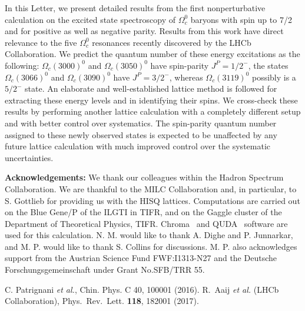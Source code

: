 \documentclass[showkeys,aps,twocolumn,showpacs,preprintnumbers,amsmath,amssymb,prd,letterpaper,floatfix,nofootinbib,superscriptaddress,]{revtex4-1}
\begin{document}
{
In this Letter, we present detailed results from the first
nonperturbative calculation on the excited state spectroscopy of
$\Omega^{0}_{c}$ baryons with spin up to 7/2 and for positive as well
as negative parity.  Results from this work have direct relevance to
the five $\Omega^{0}_{c}$ resonances recently discovered by the LHCb
Collaboration. We predict the quantum number of these energy
excitations as the following: $\Omega_c(3000)^0$ and $\Omega_c(3050)^0$
have spin-parity $J^P = 1/2^{-}$, the states $\Omega_c(3066)^0$ and
$\Omega_c(3090)^0$ have $J^P = 3/2^{-}$, whereas $\Omega_c(3119)^0$
possibly is a $5/2^{-}$ state. An elaborate and well-established
lattice method is followed for extracting these energy levels and in
identifying their spins. We cross-check these results by performing
another lattice calculation with a completely different setup and with
 better control over systematics. The spin-parity quantum number assigned
to these newly observed states is expected to be unaffected by any
future lattice calculation with much improved control over the
systematic uncertainties.

{\bf{Acknowledgements:}} We thank our colleagues within the Hadron
Spectrum Collaboration.  We are thankful to the MILC Collaboration 
and, in particular, to S. Gottlieb for providing us with the HISQ lattices.
Computations are carried out on the Blue Gene/P of the ILGTI in TIFR,
and on the Gaggle cluster of the Department of Theoretical Physics,
TIFR. Chroma~\cite{Edwards:2004sx} and 
QUDA~\cite{Clark:2009wm,Babich:2010mu} software are used for this
calculation. N. M. would like to thank A. Dighe and P. Junnarkar,  
and M. P. would like
to thank S. Collins for discussions. M. P. also acknowledges support
from the Austrian Science Fund FWF:I1313-N27 and the Deutsche
Forschungsgemeinschaft under Grant No.SFB/TRR 55.


\begin{thebibliography}{99}
 C. Patrignani {\it et al.}, Chin. Phys. C 40, 100001 (2016). 
  R.~Aaij {\it et al.} (LHCb Collaboration),
  Phys.\ Rev.\ Lett. \textbf{118}, 182001 (2017).




\end{thebibliography}}
\end{document}
